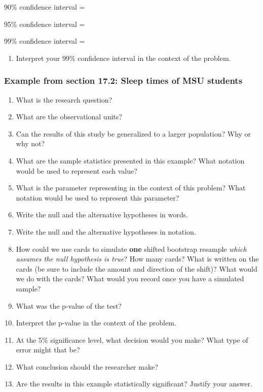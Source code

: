 \documentclass[
]{report}
\providecommand{\tightlist}{%
  \setlength{\itemsep}{0pt}\setlength{\parskip}{0pt}}
\newcommand{\rgs}{\vspace{12pt}} %
\newcommand{\rgi}{\hspace{24pt}}  %
\begin{document}
\rgi 90\% confidence interval =
\rgs 

\rgi 95\% confidence interval =
\rgs 

\rgi 99\% confidence interval =
\rgs 

\begin{enumerate}
\def\labelenumi{\arabic{enumi}.}
\setcounter{enumi}{6}
\tightlist
\item
  Interpret your 99\% confidence interval in the context of the problem.
  \rgs 
  \rgs 
\end{enumerate}

\hypertarget{example-from-section-17.2-sleep-times-of-msu-students}{%
\subsubsection*{Example from section 17.2: Sleep times of MSU students}\label{example-from-section-17.2-sleep-times-of-msu-students}}

\begin{enumerate}
\def\labelenumi{\arabic{enumi}.}
\item
  What is the research question?
  \rgs
\item
  What are the observational units?
  \rgs
\item
  Can the results of this study be generalized to a larger population? Why or why not?
  \rgs
\item
  What are the sample statistics presented in this example? What notation would be used to represent each value?
  \rgs
\item
  What is the parameter representing in the context of this problem? What notation would be used to represent this parameter?
  \rgs
  \rgs
\item
  Write the null and the alternative hypotheses in words.
  \rgs
  \rgs
\item
  Write the null and the alternative hypotheses in notation.
  \rgs
\item
  How could we use cards to simulate \textbf{one} shifted bootstrap resample \emph{which assumes the null hypothesis is true}? How many cards? What is written on the cards (be sure to include the amount and direction of the shift)? What would we do with the cards? What would you record once you have a simulated sample?
  \rgs 
  \rgs 
  \rgs 
\item
  What was the p-value of the test?
  \rgs
\item
  Interpret the p-value in the context of the problem.
  \rgs
  \rgs
\item
  At the 5\% significance level, what decision would you make? What type of error might that be?
  \rgs
\item
  What conclusion should the researcher make?
  \rgs
  \rgs
\item
  Are the results in this example statistically significant? Justify your answer.
  \rgs
\end{enumerate}
\end{document}
